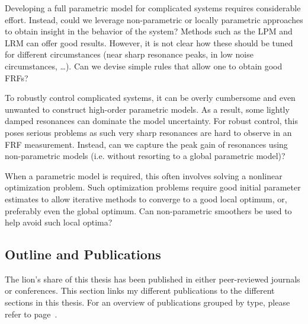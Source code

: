 \begin{question}
Developing a full parametric model for complicated systems requires considerable effort.
Instead, could we leverage non-parametric or locally parametric approaches to obtain insight in the behavior of the system?
Methods such as the \gls{LPM} and \gls{LRM} can offer good results.
However, it is not clear how these should be tuned for different circumstances (near sharp resonance peaks, in low noise circumstances, \ldots).
Can we devise simple rules that allow one to obtain good \glspl{FRF}?
\end{question}

\begin{question}
To robustly control complicated systems, it can be overly cumbersome and even unwanted to construct high-order parametric models.
As a result, some lightly damped resonances can dominate the model uncertainty.
For robust control, this poses serious problems as such very sharp resonances are hard to observe in an \gls{FRF} measurement.
Instead, can we capture the peak gain of resonances using non-parametric models (i.e. without resorting to a global parametric model)?
\end{question}

\begin{question}
When a parametric model is required, this often involves solving a nonlinear optimization problem.
Such optimization problems require good initial parameter estimates to allow iterative methods to converge to a good local optimum, or, preferably even the global optimum.
Can non-parametric smoothers be used to help avoid such local optima?
\end{question}

\subsection{Outline and Publications}
   The lion's share of this thesis has been published in either peer-reviewed  journals or conferences.
   This section links my different publications to the different sections in this thesis.
   For an overview of publications grouped by type, please refer to page~\pageref{publicationList}.

